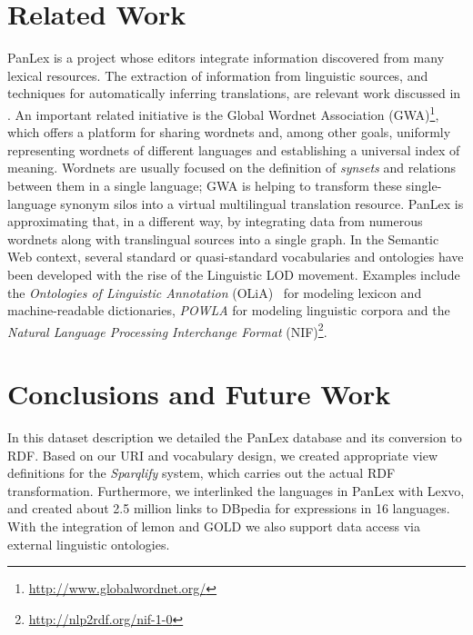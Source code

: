 \documentclass[sw]{iosart2c}
\begin{document}
\section{Related Work}
\label{sec:related}
PanLex is a project whose editors integrate information discovered from many lexical resources.
The extraction of information from linguistic sources, and techniques for automatically inferring translations,
are relevant work discussed in \cite{panlex_probtrans}.
An important related initiative is the Global Wordnet Association (GWA)\footnote{\url{http://www.globalwordnet.org/}},
which offers a platform for sharing wordnets and, among other goals, uniformly representing wordnets
of different languages and establishing a universal index of meaning.
Wordnets are usually focused on the
definition of \emph{synsets} and relations between them in a single language; GWA is helping to transform these single-language synonym silos into a virtual multilingual translation resource. PanLex is approximating that, in a different way, by integrating data from numerous wordnets along with translingual sources into a single graph.
In the Semantic Web context, several standard or quasi-standard vocabularies and ontologies have been developed with the rise of the Linguistic LOD movement.
Examples include the
\emph{Ontologies of Linguistic Annotation} (OLiA)~\cite{olia2010} for modeling
lexicon and machine-readable dictionaries, \emph{POWLA} for modeling linguistic corpora\cite{powla2012} and the \emph{Natural Language Processing Interchange Format} (NIF)\footnote{\url{http://nlp2rdf.org/nif-1-0}}.

\section{Conclusions and Future Work}
\label{sec:conclusion}
In this dataset description we detailed the PanLex database and its conversion to RDF.
Based on our URI and vocabulary design, we created appropriate view definitions
for the \emph{Sparqlify} system, which carries out the actual RDF
transformation.
Furthermore, we interlinked the languages in PanLex with Lexvo, and created about 2.5 million links to DBpedia for expressions in 16 languages.
With the integration of lemon and GOLD we also support data access via external linguistic ontologies.
\end{document}
